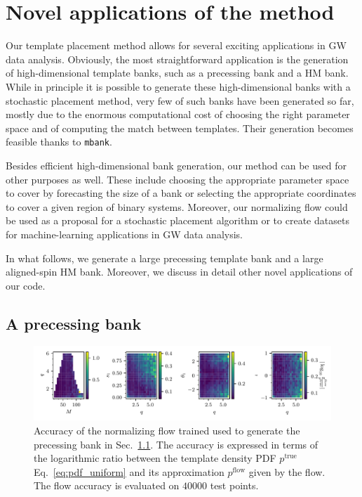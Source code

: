 \documentclass[twocolumn,showpacs,preprintnumbers,nofootinbib,prd,
superscriptaddress,10pt]{revtex4-2}
\begin{document}
\section{Novel applications of the method} \label{sec:novel_applications}

Our template placement method allows for several exciting applications in GW data analysis.
Obviously, the most straightforward application is the generation of high-dimensional template banks, such as a precessing bank and a HM bank. While in principle it is possible to generate these high-dimensional banks with a stochastic placement method, very few of such banks have been generated so far, mostly due to the enormous computational cost of choosing the right parameter space and of computing the match between templates. Their generation becomes feasible thanks to \texttt{mbank}.

Besides efficient high-dimensional bank generation, our method can be used for other purposes as well. These include choosing the appropriate parameter space to cover by forecasting the size of a bank or selecting the appropriate coordinates to cover a given region of binary systems. Moreover, our normalizing flow could be used as a proposal for a stochastic placement algorithm or to create datasets for machine-learning applications in GW data analysis.

In what follows, we generate a large precessing template bank and a large aligned-spin HM bank. Moreover, we discuss in detail other novel applications of our code.

\subsection{A precessing bank} \label{sec:precessing_bank}

\begin{figure}[t]
		\includegraphics[scale = 1.]{precessing_flow_accuracy}
		\caption{Accuracy of the normalizing flow trained used to generate the precessing bank in Sec.~\ref{sec:precessing_bank}. The accuracy is expressed in terms of the logarithmic ratio between the template density PDF $p^\text{true}$ Eq.~\eqref{eq:pdf_uniform} and its approximation $p^\text{flow}$ given by the flow. The flow accuracy is evaluated on $40000$ test points.}
		\label{fig:precessing_flow}
\end{figure}
\end{document}
